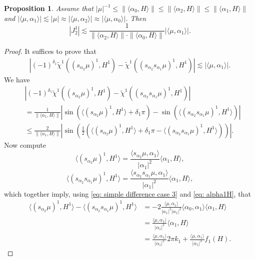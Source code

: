 \documentclass{amsart}
\numberwithin{equation}{section}
\newtheorem{prop}[thm]{Proposition}
\numberwithin{equation}{section}
\begin{document}
\begin{prop}\label{prop: tilde J2}
Assume that $|\mu|^{-1}\leq \|\langle\alpha_0,H\rangle\|\leq \|\langle\alpha_2,H\rangle\|\leq \|\langle\alpha_1,H\rangle\|$ and $| \langle\mu,\alpha_1\rangle|\lesssim |\mu|\approx |\langle\mu,\alpha_2\rangle|\approx |\langle\mu,\alpha_0\rangle|$. Then
    $$|J^1_2|\lesssim \frac{1}{\|\langle\alpha_2,H\rangle\|\cdot \|\langle\alpha_0,H\rangle\|}|\langle\mu,\alpha_1\rangle|.$$
\end{prop}
\begin{proof}
It suffices to prove that 
\begin{align}\label{eq: proving J2 tilde}
    \left|(-1)^{\delta_1}\widetilde{\chi}^1({(s_{\alpha_2}\mu)^1}, H^1)-\widetilde{\chi}^1({(s_{\alpha_2}s_{\alpha_1}\mu)^1}, H^1)\right|
    \lesssim |\langle\mu,\alpha_1\rangle|.
\end{align}
We have 
\begin{align}\label{eq: initial estimate}
 &\left|(-1)^{\delta_1}\widetilde{\chi}^1({(s_{\alpha_2}\mu)^1}, H^1)-\widetilde{\chi}^1({(s_{\alpha_2}s_{\alpha_1}\mu)^1}, H^1)\right|\nonumber\\
 &=\frac1{\|\langle\alpha_1,H\rangle\|}\left|\sin(\langle(s_{\alpha_2}\mu)^1,H^1\rangle+{\delta_1}\pi)-\sin(\langle (s_{\alpha_2}s_{\alpha_1}\mu)^1,H^1\rangle)\right|\nonumber\\
 &\leq \frac2{\|\langle\alpha_1,H\rangle\|}\left|\sin\left(\frac12(\langle(s_{\alpha_2}\mu)^1,H^1\rangle+{\delta_1}\pi-\langle (s_{\alpha_2}s_{\alpha_1}\mu)^1,H^1\rangle)\right)\right|.
\end{align}
Now compute
$$\langle(s_{\alpha_2}\mu)^1,H^1\rangle=\frac{\langle s_{\alpha_2}\mu,\alpha_1\rangle}{|\alpha_1|^2}\langle\alpha_1,H\rangle,$$
$$\langle(s_{\alpha_2}s_{\alpha_1}\mu)^1,H^1\rangle=\frac{\langle s_{\alpha_2}s_{\alpha_1}\mu,\alpha_1\rangle}{|\alpha_1|^2}\langle\alpha_1,H\rangle,$$
which together imply, using \eqref{eq: simple difference case 3} and \eqref{eq: alpha1H}, that  
\begin{align*}
\langle(s_{\alpha_2}\mu)^1,H^1\rangle-\langle(s_{\alpha_2}s_{\alpha_1}\mu)^1,H^1\rangle
    &=-
2\frac{\langle\mu,\alpha_1\rangle}{|\alpha_1|^2|\alpha_1|^2}\langle\alpha_0,\alpha_1\rangle\langle\alpha_1,H\rangle\\
&=\frac{\langle\mu,\alpha_1\rangle}{|\alpha_1|^2}\langle\alpha_1,H\rangle\\
&=\frac{\langle\mu,\alpha_1\rangle}{|\alpha_1|^2}2\pi k_1+\frac{\langle\mu,\alpha_1\rangle}{|\alpha_1|^2}f_1(H).
\end{align*}

\end{proof}
\end{document}

